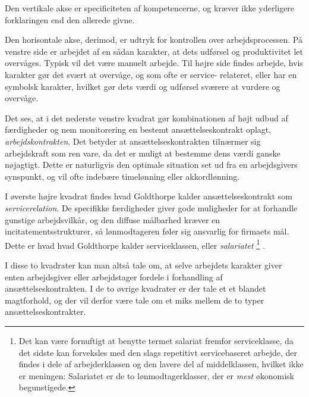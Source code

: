 Den vertikale akse er specificiteten af kompetencerne, og kræver ikke yderligere forklaringen end den allerede givne.

Den horisontale akse, derimod, er udtryk for kontrollen over arbejdsprocessen. På venstre side er arbejdet af en sådan karakter, at dets udførsel og produktivitet let overvåges. Typisk vil det være manuelt arbejde.   
Til højre side findes arbejde, hvis karakter gør det svært at overvåge, og som ofte er service- relateret, eller har en symbolsk karakter, hvilket gør dets værdi og udførsel sværere at vurdere og overvåge. 

Det ses, at i det nederste venstre kvadrat gør kombinationen af højt udbud af færdigheder og nem monitorering en bestemt ansættelseskontrakt oplagt, \emph{arbejdskontrakten}. Det betyder at ansættelseskontrakten tilnærmer sig arbejdskraft som ren vare, da det er muligt at bestemme dens værdi ganske nøjagtigt. Dette er naturligvis den optimale situation set ud fra en arbejdsgivers synspunkt, og vil ofte indebære timelønning eller akkordlønning. %

I øverste højre kvadrat findes hvad Goldthorpe kalder ansættelseskontrakt som \emph{servicerelation}. De specifikke færdigheder giver gode muligheder for at forhandle gunstige arbejdsvilkår, og den diffuse målbarhed  kræver en incitatementsstrukturer, så lønmodtageren føler sig ansvarlig for firmaets mål. Dette er hvad hvad Goldthorpe kalder serviceklassen, eller \emph{salariatet} \parencite[22]{GoldthorpeMcKnight2004}%
%
\footnote{Det kan være fornuftigt at benytte termet salariat fremfor serviceklasse, da det sidste kan forveksles med den slags repetitivt servicebaseret arbejde, der findes i dele af arbejderklassen og den lavere del af middelklassen, hvilket ikke er meningen: Salariatet er de to lønmodtagerklasser, der er \emph{mest} økonomisk begunstigede.}%
%
. %

I disse to kvadrater kan man altså tale om, at selve arbejdets karakter giver enten arbejdsgiver eller arbejdstager fordele i forhandling af ansættelseskontrakten. I de to øvrige kvadrater er der tale et et blandet magtforhold, og der vil derfor være tale om et miks mellem de to typer ansættelseskontrakter. 

